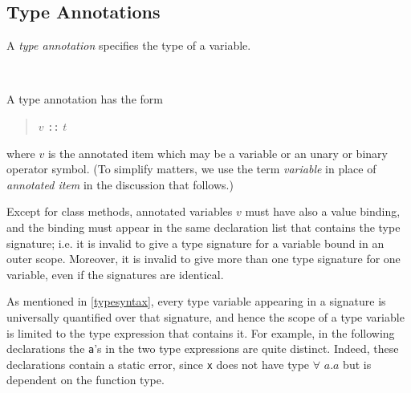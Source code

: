 \begin{flushleft}
  
  \alt {}        
  \alt {}      
\end{flushleft}

\subsection{Type Annotations} \label{annotation}

A \emph{type annotation} specifies the type of a variable.

\begin{flushleft}
  \sym{::} \\
  \oder{}  \oder{} 
\end{flushleft}


A type annotation has the form
\begin{quote}
$v$ \texttt{::} $t$
\end{quote}
where $v$ is the annotated item which may be a variable or an unary or binary operator symbol. (To simplify matters, we use the term \emph{variable} in place of \emph{annotated item} in the discussion that follows.)

Except for class methods, annotated variables $v$ must have also a value binding, and the binding must appear in the same declaration list that contains the type signature; i.e. it is invalid
to give a type signature for a variable bound in an outer scope. Moreover, it is invalid to give more than one type signature for one variable, even if the signatures are identical.

As mentioned in \autoref{typesyntax}, every type variable appearing in a signature is universally quantified over that signature, and hence the scope of a type variable is limited to the type expression that contains it.
For example, in the following declarations 
the \texttt{a}'s in the two type expressions are quite distinct.
Indeed, these declarations contain a static error, since \texttt{x} does not have type $\forall$ $a$.$a$ but is dependent on the function type.


